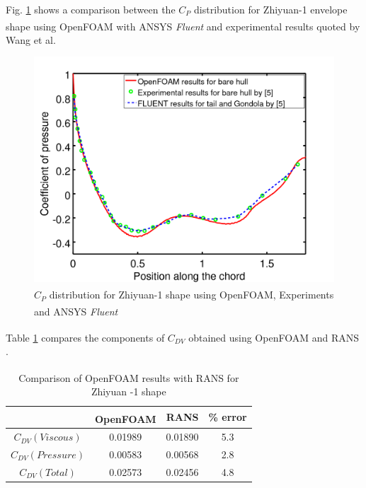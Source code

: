 Fig. \ref{Zhiyuan_OF_RANS} shows a comparison between the $C_{P}$ distribution for Zhiyuan-1 envelope shape using  OpenFOAM\textsuperscript{\textregistered} with ANSYS\textsuperscript{\textregistered} \textit{Fluent} and experimental results quoted by Wang et al. \cite{zhiyuan}
\begin{figure}[H]
	\centering
	\includegraphics[width=270 pt]{rnd/zhiyuan_cp.png}
	\caption{$C_{P}$ distribution for Zhiyuan-1 shape using OpenFOAM\textsuperscript{\textregistered}, Experiments \cite{zhiyuan} and ANSYS\textsuperscript{\textregistered} \textit{Fluent} \cite{zhiyuan}}
	\label{Zhiyuan_OF_RANS} %
\end{figure}

Table \ref{Zhiyuan -1 Cdv} compares the components of $C_{DV}$ obtained using OpenFOAM\textsuperscript{\textregistered} and RANS \cite{suman}.

\begin{table}[H]
	\centering
	\caption{\label{Zhiyuan -1 Cdv} Comparison of OpenFOAM\textsuperscript{\textregistered} results with RANS \cite{suman} for Zhiyuan -1 shape}
	\begin{tabular}{cccc}
		\hline \hline
		& OpenFOAM\textsuperscript{\textregistered} & RANS \cite{suman} & \% error    \\ \hline \hline
		
		$ C_{DV} (Viscous)$ & 0.01989 & 0.01890 & 5.3    \\  
		$ C_{DV} (Pressure) $ & 0.00583 & 0.00568 & 2.8    \\
		$ C_{DV} (Total) $ & 0.02573 & 0.02456 & 4.8    \\  \hline
	\end{tabular}
\end{table}


